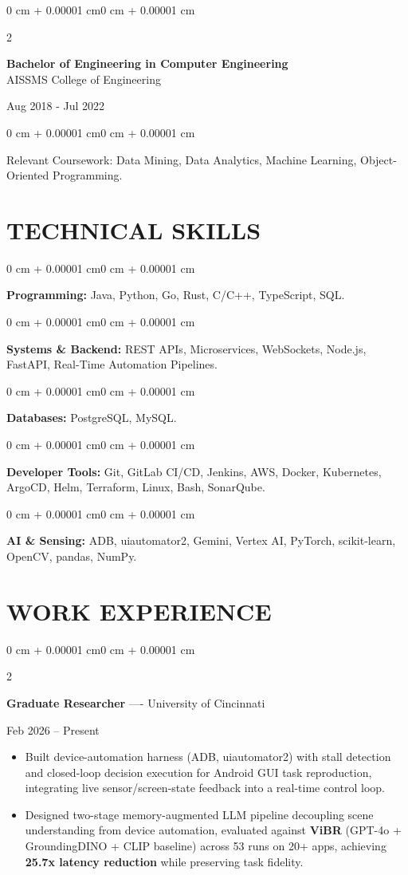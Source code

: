 \documentclass[10pt, letterpaper]{article}
\newenvironment{highlights}{
    \begin{itemize}[
        topsep=0.10 cm,
        parsep=0.06 cm,
        partopsep=0pt,
        itemsep=0.06 cm,
        leftmargin=12pt
    ]
}{
    \end{itemize}
}
\newenvironment{onecolentry}{
    \begin{adjustwidth}{0 cm + 0.00001 cm}{0 cm + 0.00001 cm}
}{
    \end{adjustwidth}
}
\newenvironment{twocolentry}[2][]{
    \onecolentry
    \def\secondColumn{#2}
    \setcolumnwidth{\fill, 4.5 cm}
    \begin{paracol}{2}
}{
    \switchcolumn \raggedleft \secondColumn
    \end{paracol}
    \endonecolentry
}
\begin{document}
\begin{twocolentry}{
    Aug 2018 - Jul 2022
}
    \textbf{Bachelor of Engineering in Computer Engineering} \\
    AISSMS College of Engineering
\end{twocolentry}
\begin{onecolentry}
Relevant Coursework: Data Mining, Data Analytics, Machine Learning, Object-Oriented Programming.
\end{onecolentry}
\section{TECHNICAL SKILLS}
\begin{onecolentry}
\textbf{Programming:} Java, Python, Go, Rust, C/C++, TypeScript, SQL.
\end{onecolentry}
\vspace{0.06 cm}
\begin{onecolentry}
\textbf{Systems \& Backend:} REST APIs, Microservices, WebSockets, Node.js, FastAPI, Real-Time Automation Pipelines.
\end{onecolentry}
\vspace{0.06 cm}
\begin{onecolentry}
\textbf{Databases:} PostgreSQL, MySQL.
\end{onecolentry}
\vspace{0.06 cm}
\begin{onecolentry}
\textbf{Developer Tools:} Git, GitLab CI/CD, Jenkins, AWS, Docker, Kubernetes, ArgoCD, Helm, Terraform, Linux, Bash, SonarQube.
\end{onecolentry}
\vspace{0.06 cm}
\begin{onecolentry}
\textbf{AI \& Sensing:} ADB, uiautomator2, Gemini, Vertex AI, PyTorch, scikit-learn, OpenCV, pandas, NumPy.
\end{onecolentry}

\section{WORK EXPERIENCE}
\begin{twocolentry}{Feb 2026 -- Present}
\textbf{Graduate Researcher} ---- University of Cincinnati
\end{twocolentry}
\begin{highlights}
  \item Built device-automation harness (ADB, uiautomator2) with stall detection and closed-loop decision execution for Android GUI task reproduction, integrating live sensor/screen-state feedback into a real-time control loop.
  \item Designed two-stage memory-augmented LLM pipeline decoupling scene understanding from device automation, evaluated against \textbf{ViBR} (GPT-4o + GroundingDINO + CLIP baseline) across 53 runs on 20+ apps, achieving \textbf{25.7x latency reduction} while preserving task fidelity.
\end{highlights}
\end{document}
